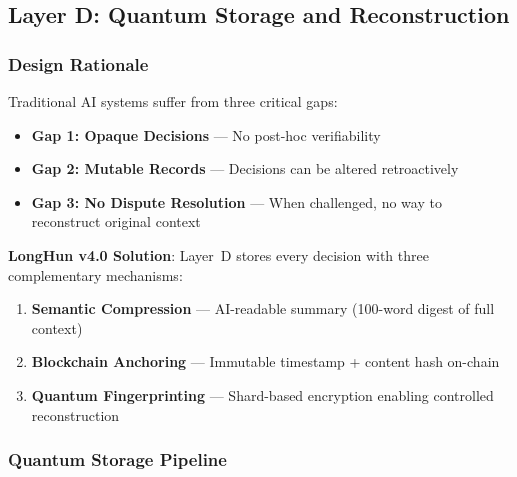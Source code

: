 \subsection{Layer D: Quantum Storage and Reconstruction}
\label{ssec:layer-d}

\subsubsection{Design Rationale}

Traditional AI systems suffer from three critical gaps:
\begin{itemize}
  \item \textbf{Gap 1: Opaque Decisions}
    — No post-hoc verifiability
  \item \textbf{Gap 2: Mutable Records}
    — Decisions can be altered retroactively
  \item \textbf{Gap 3: No Dispute Resolution}
    — When challenged, no way to reconstruct original context
\end{itemize}

\textbf{LongHun v4.0 Solution}:
Layer~D stores every decision with three complementary mechanisms:

\begin{enumerate}
  \item \textbf{Semantic Compression}
    — AI-readable summary (100-word digest of full context)
  \item \textbf{Blockchain Anchoring}
    — Immutable timestamp + content hash on-chain
  \item \textbf{Quantum Fingerprinting}
    — Shard-based encryption enabling controlled reconstruction
\end{enumerate}

\subsubsection{Quantum Storage Pipeline}

